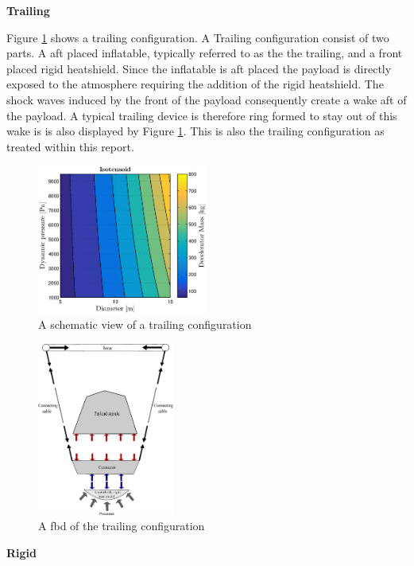 \textbf{Trailing}

Figure \ref{fig:conc_trailing} shows a trailing configuration. A Trailing configuration consist of two parts. A aft placed inflatable, typically referred to as the the trailing, and a front placed rigid heatshield. Since the inflatable is aft placed the payload is directly exposed to the atmosphere requiring the addition of the rigid heatshield. The shock waves induced by the front of the payload consequently create a wake aft of the payload. A typical trailing device is therefore ring formed to stay out of this wake is is also displayed by Figure \ref{fig:conc_trailing}. This is also the trailing configuration as treated within this report.

\begin{figure}[H]
\centering
\includegraphics[width = 0.5\textwidth]{Figure/ISO_comp.eps}
\caption{A schematic view of a trailing configuration}
\label{fig:conc_trailing}
\end{figure}

\begin{figure}[H]
\centering
\includegraphics[width = 0.4\textwidth]{Figure/FBD_trailing.eps}
\caption{A \gls{fbd} of the trailing configuration}
\label{fig:fbd_trailing}
\end{figure}

\textbf{Rigid}

